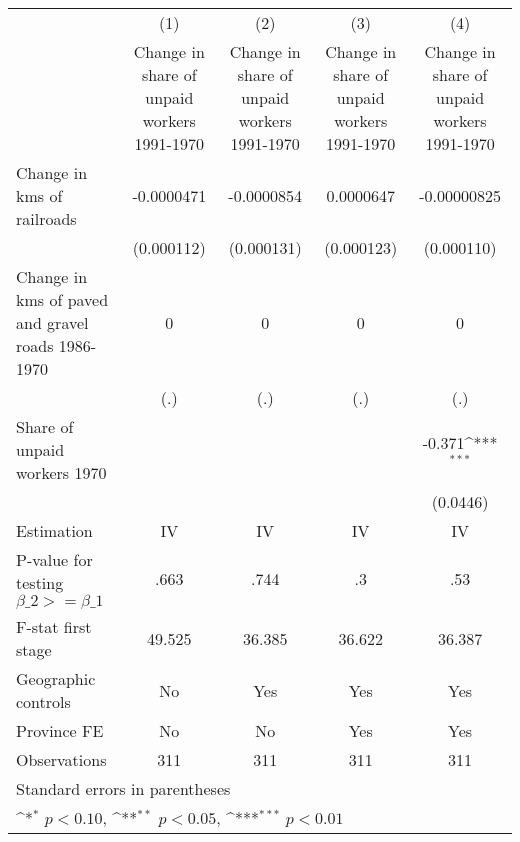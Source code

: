 {
\def\sym#1{\ifmmode^{#1}\else\(^{#1}\)\fi}
\begin{tabular}{l*{4}{c}}
\hline\hline
                &\multicolumn{1}{c}{(1)}&\multicolumn{1}{c}{(2)}&\multicolumn{1}{c}{(3)}&\multicolumn{1}{c}{(4)}\\
                &\multicolumn{1}{c}{Change in share of unpaid workers 1991-1970}&\multicolumn{1}{c}{Change in share of unpaid workers 1991-1970}&\multicolumn{1}{c}{Change in share of unpaid workers 1991-1970}&\multicolumn{1}{c}{Change in share of unpaid workers 1991-1970}\\
\hline
Change in kms of railroads&-0.0000471         &-0.0000854         &0.0000647         &-0.00000825         \\
                &(0.000112)         &(0.000131)         &(0.000123)         &(0.000110)         \\
[1em]
Change in kms of paved and gravel roads 1986-1970&        0         &        0         &        0         &        0         \\
                &      (.)         &      (.)         &      (.)         &      (.)         \\
[1em]
Share of unpaid workers 1970&                  &                  &                  &   -0.371\sym{***}\\
                &                  &                  &                  & (0.0446)         \\
\hline
Estimation      &       IV         &       IV         &       IV         &       IV         \\
P-value for testing $\beta\_2 >= \beta\_1$&     .663         &     .744         &       .3         &      .53         \\
F-stat first stage&   49.525         &   36.385         &   36.622         &   36.387         \\
Geographic controls&       No         &      Yes         &      Yes         &      Yes         \\
Province FE     &       No         &       No         &      Yes         &      Yes         \\
Observations    &      311         &      311         &      311         &      311         \\
\hline\hline
\multicolumn{5}{l}{\footnotesize Standard errors in parentheses}\\
\multicolumn{5}{l}{\footnotesize \sym{*} \(p<0.10\), \sym{**} \(p<0.05\), \sym{***} \(p<0.01\)}\\
\end{tabular}
}
